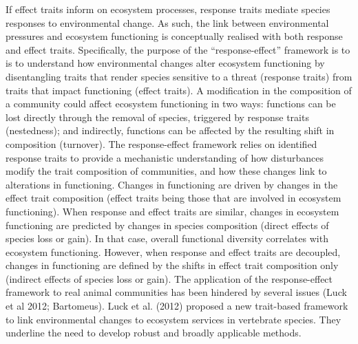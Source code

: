 If effect traits inform on ecosystem processes, response traits mediate species responses to environmental change. As such, the link between environmental pressures and ecosystem functioning is conceptually realised with both response and effect traits. Specifically, the purpose of the “response-effect” framework is to is to understand how environmental changes alter ecosystem functioning by disentangling traits that render species sensitive to a threat (response traits) from traits that impact functioning (effect traits). A modification in the composition of a community could affect ecosystem functioning in two ways: functions can be lost directly through the removal of species, triggered by response traits (nestedness); and indirectly, functions can be affected by the resulting shift in composition (turnover). The response-effect framework relies on identified response traits to provide a mechanistic understanding of how disturbances modify the trait composition of communities, and how these changes link to alterations in functioning. Changes in functioning are driven by changes in the effect trait composition (effect traits being those that are involved in ecosystem functioning). When response and effect traits are similar, changes in ecosystem functioning are predicted by changes in species composition (direct effects of species loss or gain). In that case, overall functional diversity correlates with ecosystem functioning. However, when response and effect traits are decoupled, changes in functioning are defined by the shifts in effect trait composition only (indirect effects of species loss or gain). 
The application of the response-effect framework to real animal communities has been hindered by several issues (Luck et al 2012; Bartomeus). Luck et al. (2012) proposed a new trait-based framework to link environmental changes to ecosystem services in vertebrate species. They underline the need to develop robust and broadly applicable methods. 
